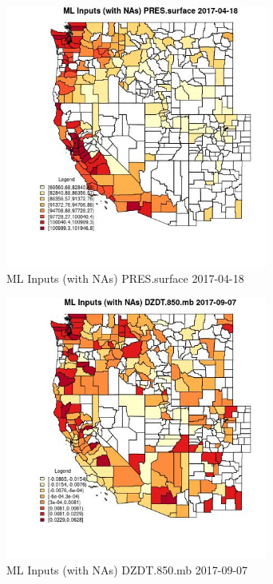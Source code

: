 \begin{figure} 
\centering  
\includegraphics[width=0.77\textwidth]{Code_Outputs/Report_ML_input_PM25_Step4_part_e_de_duplicated_aves_compiled_2019-05-21wNAs_CountyPRESsurfaceMean2017-04-18.jpg} 
\caption{\label{fig:Report_ML_input_PM25_Step4_part_e_de_duplicated_aves_compiled_2019-05-21wNAsCountyPRESsurfaceMean2017-04-18}ML Inputs (with NAs) PRES.surface 2017-04-18} 
\end{figure} 
 

\begin{figure} 
\centering  
\includegraphics[width=0.77\textwidth]{Code_Outputs/Report_ML_input_PM25_Step4_part_e_de_duplicated_aves_compiled_2019-05-21wNAs_CountyDZDT850mbMean2017-09-07.jpg} 
\caption{\label{fig:Report_ML_input_PM25_Step4_part_e_de_duplicated_aves_compiled_2019-05-21wNAsCountyDZDT850mbMean2017-09-07}ML Inputs (with NAs) DZDT.850.mb 2017-09-07} 
\end{figure} 
 

